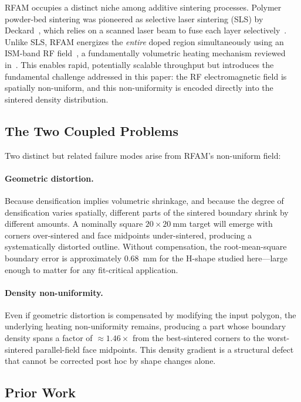 \documentclass[5p,times]{elsarticle}
\begin{document}
RFAM occupies a distinct niche among additive sintering processes.
Polymer powder-bed sintering was pioneered as selective laser sintering
(SLS) by Deckard~\cite{deckard1989method}, which relies on a scanned
laser beam to fuse each layer selectively~\cite{lupone2021process,bourell2014performance}.  Unlike SLS, RFAM energizes the \emph{entire}
doped region simultaneously using an ISM-band RF field~\cite{wroe1998rfmicrowave},
a fundamentally volumetric heating mechanism reviewed
in~\cite{Beaman2020AdditiveMR,gibson2015additive}.  This enables
rapid, potentially scalable throughput but introduces the fundamental
challenge addressed in this paper: the RF electromagnetic field is
spatially non-uniform, and this non-uniformity is encoded directly
into the sintered density distribution.

\subsection{The Two Coupled Problems}

Two distinct but related failure modes arise from RFAM's non-uniform
field:

\paragraph{Geometric distortion.}
Because densification implies volumetric shrinkage, and because the
degree of densification varies spatially, different parts of the
sintered boundary shrink by different amounts.  A nominally square
$20 \times \SI{20}{\milli\meter}$ target will emerge with corners
over-sintered and face midpoints under-sintered, producing a
systematically distorted outline.  Without compensation, the
root-mean-square boundary error is approximately \SI{0.68}{\milli\meter}
for the H-shape studied here---large enough to matter for any
fit-critical application.

\paragraph{Density non-uniformity.}
Even if geometric distortion is compensated by modifying the input
polygon, the underlying heating non-uniformity remains, producing
a part whose boundary density spans a factor of $\approx 1.46\times$
from the best-sintered corners to the worst-sintered parallel-field
face midpoints.  This density gradient is a structural defect that
cannot be corrected post hoc by shape changes alone.

\subsection{Prior Work}
\end{document}
